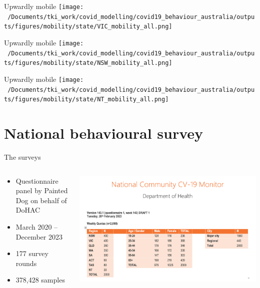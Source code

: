 \documentclass[
  ignorenonframetext,
  aspectratio=149,
]{beamer}
\providecommand{\tightlist}{%
  \setlength{\itemsep}{0pt}\setlength{\parskip}{0pt}}\usepackage{longtable,booktabs,array}
\begin{document}
\begin{frame}{Upwardly mobile}
\label{upwardly-mobile-1}
\texttt{[image: ~/Documents/tki\_work/covid\_modelling/covid19\_behaviour\_australia/outputs/figures/mobility/state/VIC\_mobility\_all.png]}
\end{frame}

\begin{frame}{Upwardly mobile}
\label{upwardly-mobile-2}
\texttt{[image: ~/Documents/tki\_work/covid\_modelling/covid19\_behaviour\_australia/outputs/figures/mobility/state/NSW\_mobility\_all.png]}
\end{frame}

\begin{frame}{Upwardly mobile}
\label{upwardly-mobile-3}
\texttt{[image: ~/Documents/tki\_work/covid\_modelling/covid19\_behaviour\_australia/outputs/figures/mobility/state/NT\_mobility\_all.png]}
\end{frame}

\section{National behavioural survey}\label{national-behavioural-survey}

\begin{frame}{The surveys}
\label{the-surveys}
\begin{columns}[T]
\begin{column}{0.4\textwidth}
\begin{itemize}
\tightlist
\item
  Questionnaire panel by Painted Dog on behalf of DoHAC
\item
  March 2020 -- December 2023
\item
  177 survey rounds
\item
  378,428 samples
\end{itemize}
\end{column}

\begin{column}{0.6\textwidth}
\includegraphics{images/survey_numbers.png}
\end{column}
\end{columns}
\end{frame}
\end{document}
